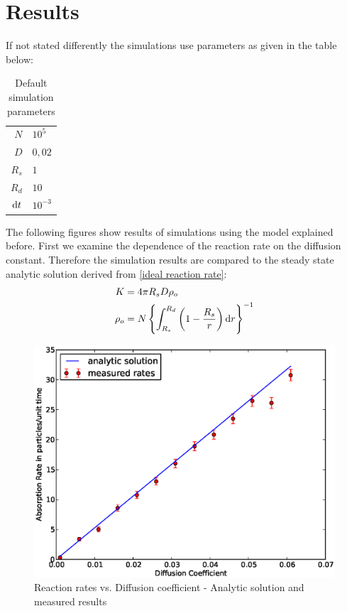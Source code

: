 \section{Results}
If not stated differently the simulations use parameters as given in the table below:
\begin{table}[H]
    \centering
    \begin{tabular}{r|l}
        $N$ & $10^{5}$\\
        $D$ & $0,02$\\
        $R_s$ & $1$ \\
        $R_d$ & $10$ \\
        ${\rm d}t$ & $10^{-3}$
    \end{tabular}
    \caption{Default simulation parameters}
    \label{tab:Parameters}
\end{table}
The following figures show results of simulations using the model explained before. First we examine the dependence of the reaction rate on the diffusion constant. Therefore the simulation results are compared to the steady state analytic solution derived from \eqref{ideal reaction rate}:
\begin{align}
    K &= 4 \pi R_s D \rho_o \\
    \rho_o &= N \left\{ \int_{R_s}^{R_d} \left( 1 - \frac{R_s}{r} \right) {\rm d} r \right\}^{-1}
    \label{Steady_state_rate}
\end{align}
\begin{figure}[H]
    \centering
    \includegraphics[width=.9 \textwidth, keepaspectratio]{Kabs.eps}
    \caption{Reaction rates vs. Diffusion coefficient - Analytic solution and measured results}
    \label{fig:Kabs_D}
\end{figure}
